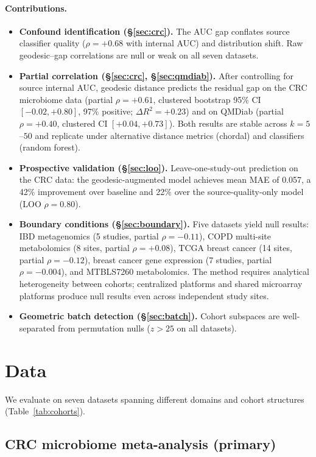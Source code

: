\documentclass[11pt]{article}
\begin{document}
\paragraph{Contributions.}
\begin{itemize}
\item \textbf{Confound identification (\S\ref{sec:crc}).} The AUC gap conflates source classifier quality ($\rho = +0.68$ with internal AUC) and distribution shift. Raw geodesic--gap correlations are null or weak on all seven datasets.
\item \textbf{Partial correlation (\S\ref{sec:crc}, \S\ref{sec:qmdiab}).} After controlling for source internal AUC, geodesic distance predicts the residual gap on the CRC microbiome data (partial $\rho = +0.61$, clustered bootstrap 95\% CI $[-0.02, +0.80]$, 97\% positive; $\Delta R^2 = +0.23$) and on QMDiab (partial $\rho = +0.40$, clustered CI $[+0.04, +0.73]$). Both results are stable across $k = 5$--$50$ and replicate under alternative distance metrics (chordal) and classifiers (random forest).
\item \textbf{Prospective validation (\S\ref{sec:loo}).} Leave-one-study-out prediction on the CRC data: the geodesic-augmented model achieves mean MAE of 0.057, a 42\% improvement over baseline and 22\% over the source-quality-only model (LOO $\rho = 0.80$).
\item \textbf{Boundary conditions (\S\ref{sec:boundary}).} Five datasets yield null results: IBD metagenomics (5 studies, partial $\rho = -0.11$), COPD multi-site metabolomics (8 sites, partial $\rho = +0.08$), TCGA breast cancer (14 sites, partial $\rho = -0.12$), breast cancer gene expression (7 studies, partial $\rho = -0.004$), and MTBLS7260 metabolomics. The method requires analytical heterogeneity between cohorts; centralized platforms and shared microarray platforms produce null results even across independent study sites.
\item \textbf{Geometric batch detection (\S\ref{sec:batch}).} Cohort subspaces are well-separated from permutation nulls ($z > 25$ on all datasets).
\end{itemize}


\section{Data}

We evaluate on seven datasets spanning different domains and cohort structures (Table~\ref{tab:cohorts}).

\subsection{CRC microbiome meta-analysis (primary)}
\label{sec:crc_data}
\end{document}
